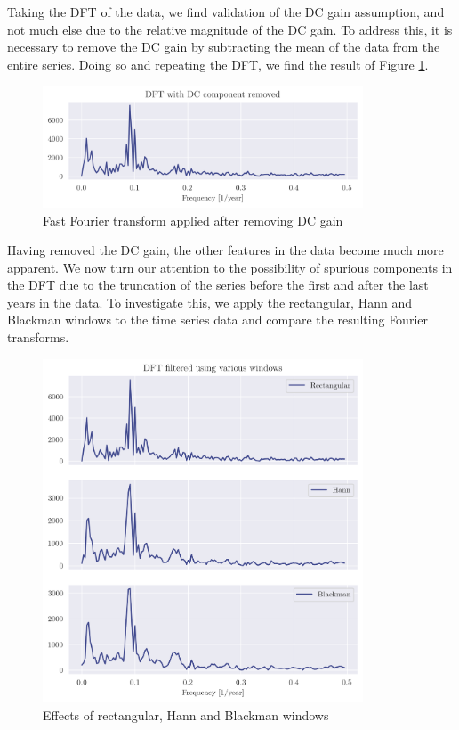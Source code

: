 \documentclass[a4paper, 11pt]{article}
\begin{document}
Taking the DFT of the data, we find validation of the DC gain assumption, and
not much else due to the relative magnitude of the DC gain. To address this, it
is necessary to remove the DC gain by subtracting the mean of the data from the
entire series. Doing so and repeating the DFT, we find the result of Figure
\ref{fig:q8_nodcdft}.

\newpage

\begin{figure}[ht]
    \centering
    \includegraphics[width=0.85\textwidth]{images/q8_nodcdft.png}
    \caption{Fast Fourier transform applied after removing DC gain}
    \label{fig:q8_nodcdft}
\end{figure}

Having removed the DC gain, the other features in the data become much more
apparent. We now turn our attention to the possibility of spurious components
in the DFT due to the truncation of the series before the first and after the
last years in the data. To investigate this, we apply the rectangular, Hann and
Blackman windows to the time series data and compare the resulting Fourier
transforms.

\begin{figure}[ht!]
    \centering
    \includegraphics[width=0.85\textwidth]{images/q8_windowed.png}
    \caption{Effects of rectangular, Hann and Blackman windows}
    \label{fig:q8_windows}
\end{figure}
\end{document}
